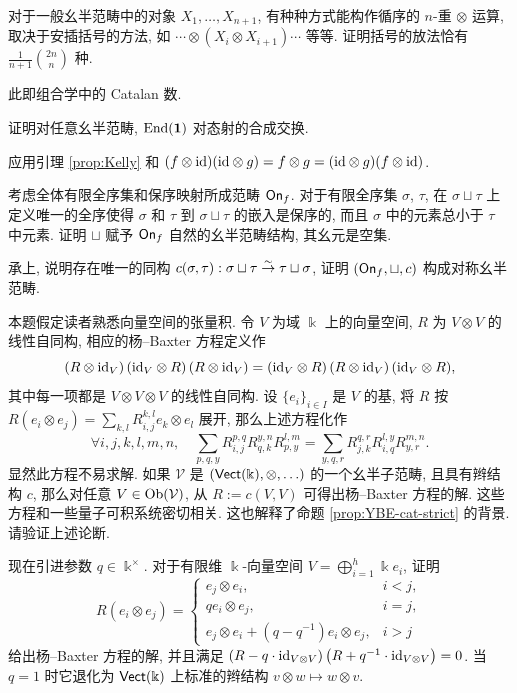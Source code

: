 \begin{Exercises}
	\item 对于一般幺半范畴中的对象 $X_1, \ldots, X_{n+1}$, 有种种方式能构作循序的 $n$-重 $\otimes$ 运算, 取决于安插括号的方法, 如 $\cdots \otimes (X_i \otimes X_{i+1}) \cdots$ 等等. 证明括号的放法恰有 $\frac{1}{n+1} \binom{2n}{n}$ 种. \begin{hint} 此即组合学中的 Catalan 数. \end{hint}
	\item 证明对任意幺半范畴, $\operatorname{End}(\mathbf{1})$ 对态射的合成交换. \begin{hint} 应用引理 \ref{prop:Kelly} 和 $(f \otimes \mathrm{id})(\mathrm{id} \otimes g) = f \otimes g = (\mathrm{id} \otimes g) (f \otimes \mathrm{id})$.\end{hint}
	\item 考虑全体有限全序集和保序映射所成范畴 $\mathsf{On}_f$. 对于有限全序集 $\sigma$, $\tau$, 在 $\sigma \sqcup \tau$ 上定义唯一的全序使得 $\sigma$ 和 $\tau$ 到 $\sigma \sqcup \tau$ 的嵌入是保序的, 而且 $\sigma$ 中的元素总小于 $\tau$ 中元素. 证明 $\sqcup$ 赋予 $\mathsf{On}_f$ 自然的幺半范畴结构, 其幺元是空集.
	\item 承上, 说明存在唯一的同构 $c(\sigma, \tau): \sigma \sqcup \tau \stackrel{\sim}{\rightarrow} \tau \sqcup \sigma$, 证明 $(\mathsf{On}_f, \sqcup, c)$ 构成对称幺半范畴.
	\item 本题假定读者熟悉向量空间的张量积. 令 $V$ 为域 $\Bbbk$ 上的向量空间, $R$ 为 $V \otimes V$ 的线性自同构, 相应的杨--Baxter 方程定义作
		\[ (R \otimes \mathrm{id}_V) \, (\mathrm{id}_V \otimes R) \, (R \otimes \mathrm{id}_V) = (\mathrm{id}_V \otimes R) \, (R \otimes \mathrm{id}_V) \, (\mathrm{id}_V \otimes R) , \]
		其中每一项都是 $V \otimes V \otimes V$ 的线性自同构. 设 $\{e_i\}_{i \in I}$ 是 $V$ 的基, 将 $R$ 按 $R(e_i \otimes e_j) = \sum_{k,l} R^{k,l}_{i,j} e_k \otimes e_l$ 展开, 那么上述方程化作
		\[ \forall i,j,k,l,m,n, \quad \sum_{p,q,y} R^{p,q}_{i,j} R^{y,n}_{q,k} R^{l,m}_{p,y} = \sum_{y,q,r} R^{q,r}_{j,k} R^{l,y}_{i,q} R^{m,n}_{y,r}.  \]
		显然此方程不易求解. 如果 $\mathcal{V}$ 是 $(\mathsf{Vect}(\Bbbk), \otimes, \ldots)$ 的一个幺半子范畴, 且具有辫结构 $c$, 那么对任意 $V \in \operatorname{Ob}(\mathcal{V})$, 从 $R := c(V,V)$ 可得出杨--Baxter 方程的解. 这些方程和一些量子可积系统密切相关. 这也解释了命题 \ref{prop:YBE-cat-strict} 的背景. 请验证上述论断.
		
		现在引进参数 $q \in \Bbbk^\times$. 对于有限维 $\Bbbk$-向量空间 $V = \bigoplus_{i=1}^h \Bbbk e_i$, 证明
		\[ R(e_i \otimes e_j) = \begin{cases}
			e_j \otimes e_i, & i < j, \\
			q e_i \otimes e_j, & i = j, \\
			e_j \otimes e_i + (q - q^{-1}) e_i \otimes e_j, & i > j
		\end{cases} \]
		给出杨--Baxter 方程的解, 并且满足 $\left( R - q \cdot \mathrm{id}_{V \otimes V} \right) \left( R + q^{-1} \cdot \mathrm{id}_{V \otimes V} \right) = 0$. 当 $q=1$ 时它退化为 $\mathsf{Vect}(\Bbbk)$ 上标准的辫结构 $v \otimes w \mapsto w \otimes v$. 


\end{Exercises}
